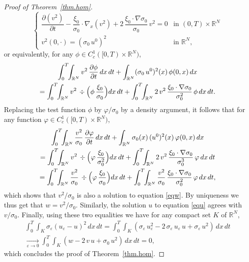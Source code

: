 \documentclass[JEP,XML,SOM,Unicode]{cedram}
\let \ph \varphi
\def \RR {\mathbb R}
\theoremstyle{plain}
\theoremstyle{definition}
\begin{document}
\begin{proof}[Proof of Theorem~\ref{thm.hom}]
\[
\begin{cases}
\dfrac{\partial(v^2)}{\partial t}-\dfrac{\xi_0}{\sigma_0}\cdot\nabla_x(v^2)+2\, \dfrac{\xi_0\cdot\nabla\sigma_0}{\sigma_0}\,v^2=0 & \mbox{in }(0,T)\times\RR^N
\\[5pt]
v^2(0,\cdot)=(\sigma_0\, u^0)^2 & \mbox{in }\RR^N,
\end{cases}
\]
or equivalently, for any $\phi\in C^1_c([0,T)\times\RR^N)$,
\begin{multline*}
 \int_0^T\!\!\int_{\RR^N}v^2\, \dfrac{\partial\phi}{\partial t}\,dx\,dt+\int_{\RR^N}(\sigma_0\, u^0)^2(x)\,\phi(0,x)\,dx
\\
=\int_0^T\!\!\int_{\RR^N}v^2\,\div\Bigl(\phi\, \dfrac{\xi_0}{\sigma_0}\Bigr)dx\,dt+\int_0^T\!\!\int_{\RR^N}2\,v^2\, \dfrac{\xi_0\cdot\nabla\sigma_0}{\sigma_0^2}\,\phi\,dx\,dt.
\end{multline*}
Replacing the test function $\phi$ by $\ph/\sigma_0$ by a density argument, it follows that for any function $\ph\in C^1_c([0,T)\times\RR^N)$,
\begin{multline*}
 \int_0^T\!\!\int_{\RR^N} \dfrac{v^2}{\sigma_0}\, \dfrac{\partial\ph}{\partial t}\,dx\,dt+\int_{\RR^N}\sigma_0(x)\,(u^0)^2(x)\,\ph(0,x)\,dx
\\
=\int_0^T\!\!\int_{\RR^N}v^2\,\div\Bigl(\ph\, \dfrac{\xi_0}{\sigma_0^2}\Bigr)dx\,dt+\int_0^T\!\!\int_{\RR^N}2\,v^2\, \dfrac{\xi_0\cdot\nabla\sigma_0}{\sigma_0^3}\,\ph\,dx\,dt
\\
=\int_0^T\!\!\int_{\RR^N} \dfrac{v^2}{\sigma_0}\,\div\Bigl(\ph\, \dfrac{\xi_0}{\sigma_0}\Bigr)dx\,dt+\int_0^T\!\!\int_{\RR^N} \dfrac{v^2}{\sigma_0}\, \dfrac{\xi_0\cdot\nabla\sigma_0}{\sigma_0^2}\,\ph\,dx\,dt,
\end{multline*}
which shows that $v^2/\sigma_0$ is also a solution to equation \eqref{eqw}. By uniqueness we thus get that $w=v^2/\sigma_0$.
Similarly, the solution $u$ to equation \eqref{equ} agrees with $v/\sigma_0$.
Finally, using these two equalities we have for any compact set $K$ of $\RR^N$,
\begin{multline*}
 \int_0^T\!\!\int_{K}\sigma_\varepsilon(u_\varepsilon-u)^2\,dx\,dt=\int_0^T\!\!\int_{K}(\sigma_\varepsilon\,u_\varepsilon^2-2\,\sigma_\varepsilon\,u_\varepsilon\,u+\sigma_\varepsilon\,u^2)\,dx\,dt
\\[-8pt]
\xrightarrow[\varepsilon\to 0]\;\int_0^T\!\!\int_{K}(w-2\,v\,u+\sigma_0\,u^2)\,dx\,dt=0,
\end{multline*}
which concludes the proof of Theorem~\ref{thm.hom}.
\end{proof}
\end{document}
